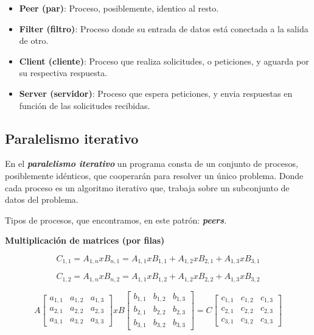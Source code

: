 \documentclass[a4paper, 10pt]{report}
\begin{document}
\begin{itemize}
	\item \textbf{Peer (par)}: Proceso, posiblemente, identico al resto.
	\item \textbf{Filter (filtro)}: Proceso donde su entrada de datos está conectada a la salida de otro.
	\item \textbf{Client (cliente)}: Proceso que realiza solicitudes, o peticiones, y aguarda por su respectiva respuesta.
	\item \textbf{Server (servidor)}: Proceso que espera peticiones, y envia respuestas en función de las solicitudes recibidas.
\end{itemize}

\subsection{Paralelismo iterativo}

En el \textbf{\emph{paralelismo iterativo}} un programa consta de un conjunto de procesos, posiblemente idénticos, que cooperarán para resolver un único problema. Donde cada proceso es un algoritmo iterativo que, trabaja sobre un subconjunto de datos del problema.

Tipos de procesos, que encontramos, en este patrón: \textbf{\emph{peers}}.

\textbf{Multiplicación de matrices (por filas)}

\begin{equation}
	C_{1,1} = A_{1,n} x B_{n,1} = A_{1,1} x B_{1,1} + A_{1,2} x B_{2,1} + A_{1,3} x B_{3,1}
\end{equation}

\begin{equation}
	C_{1,2} = A_{1,n} x B_{n,2} = A_{1,1} x B_{1,2} + A_{1,2} x B_{2,2} + A_{1,3} x B_{3,2}
\end{equation}

\begin{equation}
A\begin{bmatrix}
a_{1,1} & a_{1,2} & a_{1,3}\\
a_{2,1} & a_{2,2} & a_{2,3}\\
a_{3,1} & a_{3,2} & a_{3,3}
\end{bmatrix}
x
B\begin{bmatrix}
b_{1,1} & b_{1,2} & b_{1,3}\\
b_{2,1} & b_{2,2} & b_{2,3}\\
b_{3,1} & b_{3,2} & b_{3,3}
\end{bmatrix}
=
C\begin{bmatrix}
c_{1,1} & c_{1,2} & c_{1,3}\\
c_{2,1} & c_{2,2} & c_{2,3}\\
c_{3,1} & c_{3,2} & c_{3,3}
\end{bmatrix}
\end{equation}
\end{document}
